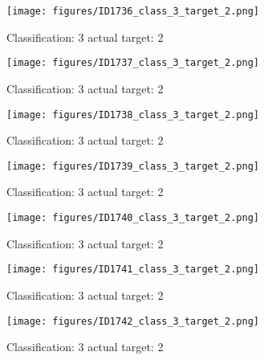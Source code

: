 \begin{figure}[h!]
\begin{center}
\texttt{[image: figures/ID1736\_class\_3\_target\_2.png]}
\end{center}
\caption{ Classification: 3 actual target: 2}
\label{fig:ID1736_class_3_target_2}
\end{figure}
\begin{figure}[h!]
\begin{center}
\texttt{[image: figures/ID1737\_class\_3\_target\_2.png]}
\end{center}
\caption{ Classification: 3 actual target: 2}
\label{fig:ID1737_class_3_target_2}
\end{figure}
\begin{figure}[h!]
\begin{center}
\texttt{[image: figures/ID1738\_class\_3\_target\_2.png]}
\end{center}
\caption{ Classification: 3 actual target: 2}
\label{fig:ID1738_class_3_target_2}
\end{figure}
\begin{figure}[h!]
\begin{center}
\texttt{[image: figures/ID1739\_class\_3\_target\_2.png]}
\end{center}
\caption{ Classification: 3 actual target: 2}
\label{fig:ID1739_class_3_target_2}
\end{figure}
\begin{figure}[h!]
\begin{center}
\texttt{[image: figures/ID1740\_class\_3\_target\_2.png]}
\end{center}
\caption{ Classification: 3 actual target: 2}
\label{fig:ID1740_class_3_target_2}
\end{figure}
\begin{figure}[h!]
\begin{center}
\texttt{[image: figures/ID1741\_class\_3\_target\_2.png]}
\end{center}
\caption{ Classification: 3 actual target: 2}
\label{fig:ID1741_class_3_target_2}
\end{figure}
\begin{figure}[h!]
\begin{center}
\texttt{[image: figures/ID1742\_class\_3\_target\_2.png]}
\end{center}
\caption{ Classification: 3 actual target: 2}
\label{fig:ID1742_class_3_target_2}
\end{figure}

